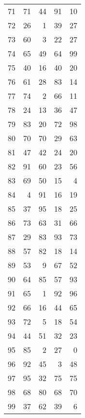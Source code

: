 \begin{longtable}{lrrrr}
71 &  71 &  44 &  91 &  10 \\
72 &  26 &   1 &  39 &  27 \\
73 &  60 &   3 &  22 &  27 \\
74 &  65 &  49 &  64 &  99 \\
75 &  40 &  16 &  40 &  20 \\
76 &  61 &  28 &  83 &  14 \\
77 &  74 &   2 &  66 &  11 \\
78 &  24 &  13 &  36 &  47 \\
79 &  83 &  20 &  72 &  98 \\
80 &  70 &  70 &  29 &  63 \\
81 &  47 &  42 &  24 &  20 \\
82 &  91 &  60 &  23 &  56 \\
83 &  69 &  50 &  15 &   4 \\
84 &   4 &  91 &  16 &  19 \\
85 &  37 &  95 &  18 &  25 \\
86 &  73 &  63 &  31 &  66 \\
87 &  29 &  83 &  93 &  73 \\
88 &  57 &  82 &  18 &  14 \\
89 &  53 &   9 &  67 &  52 \\
90 &  64 &  85 &  57 &  93 \\
91 &  65 &   1 &  92 &  96 \\
92 &  66 &  16 &  44 &  65 \\
93 &  72 &   5 &  18 &  54 \\
94 &  44 &  51 &  32 &  23 \\
95 &  85 &   2 &  27 &   0 \\
96 &  92 &  45 &   3 &  48 \\
97 &  95 &  32 &  75 &  75 \\
98 &  68 &  80 &  68 &  70 \\
99 &  37 &  62 &  39 &   6 \\
\end{longtable}
